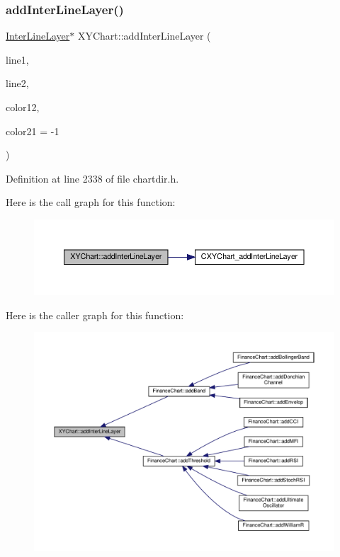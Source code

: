 \subsubsection{\texorpdfstring{add\+Inter\+Line\+Layer()}{addInterLineLayer()}}
{\footnotesize\ttfamily \hyperlink{class_inter_line_layer}{Inter\+Line\+Layer}$\ast$ X\+Y\+Chart\+::add\+Inter\+Line\+Layer (\begin{DoxyParamCaption}\item[{Line\+Obj $\ast$}]{line1,  }\item[{Line\+Obj $\ast$}]{line2,  }\item[{int}]{color12,  }\item[{int}]{color21 = {\ttfamily -\/1} }\end{DoxyParamCaption})\hspace{0.3cm}{\ttfamily [inline]}}



Definition at line 2338 of file chartdir.\+h.

Here is the call graph for this function\+:
\nopagebreak
\begin{figure}[H]
\begin{center}
\leavevmode
\includegraphics[width=350pt]{class_x_y_chart_ae674c8d52d32574672d845c5f154f9d3_cgraph}
\end{center}
\end{figure}
Here is the caller graph for this function\+:
\nopagebreak
\begin{figure}[H]
\begin{center}
\leavevmode
\includegraphics[width=350pt]{class_x_y_chart_ae674c8d52d32574672d845c5f154f9d3_icgraph}
\end{center}
\end{figure}
\mbox{\label{class_x_y_chart_aea36113ca810376bd55e2d836b0fe7e5}} 
